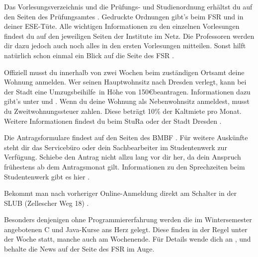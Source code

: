 \begin{itemize}[leftmargin=*]
Das Vorlesungsverzeichnis und die Prüfungs- und Studienordnung erhältst du auf den Seiten des Prüfungsamtes .
Gedruckte Ordnungen gibt's beim FSR und in deiner ESE-Tüte.
Alle wichtigen Informationen zu den einzelnen Vorlesungen findest du auf den jeweiligen Seiten der Institute im Netz.
Die Professoren werden dir dazu jedoch auch noch alles in den ersten Vorlesungen mitteilen. Sonst hilft natürlich schon einmal ein Blick auf die Seite des FSR .

Offiziell musst du innerhalb von zwei Wochen beim zuständigen Ortsamt  deine Wohnung anmelden.
Wer seinen Hauptwohnsitz nach Dresden verlegt, kann bei der Stadt eine \glqq Umzugsbeihilfe\grqq\ in Höhe von 150\euro beantragen.
Informationen dazu gibt's unter  und .
Wenn du deine Wohnung als Nebenwohnsitz anmeldest, musst du Zweitwohnungssteuer zahlen. Diese beträgt 10\% der Kaltmiete pro Monat. Weitere Informationen findest du beim StuRa  oder der Stadt Dresden .

Die Antragsformulare findest auf den Seiten des BMBF . Für weitere Auskünfte steht dir das Servicebüro oder dein Sachbearbeiter im Studentenwerk zur Verfügung.
Schiebe den Antrag nicht allzu lang vor dir her, da dein Anspruch frühestens ab dem Antragsmonat gilt.
Informationen zu den Sprechzeiten beim Studentenwerk gibt es hier .

Bekommt man nach vorheriger Online-Anmeldung direkt am Schalter in der SLUB (Zellescher Weg 18) .

Besonders denjenigen ohne Programmiererfahrung werden die im Wintersemester angebotenen C und Java-Kurse ans Herz gelegt.
Diese finden in der Regel unter der Woche statt, manche auch am Wochenende.
Für Details wende dich an ,  und behalte die News auf der Seite des FSR  im Auge.


\end{itemize}
